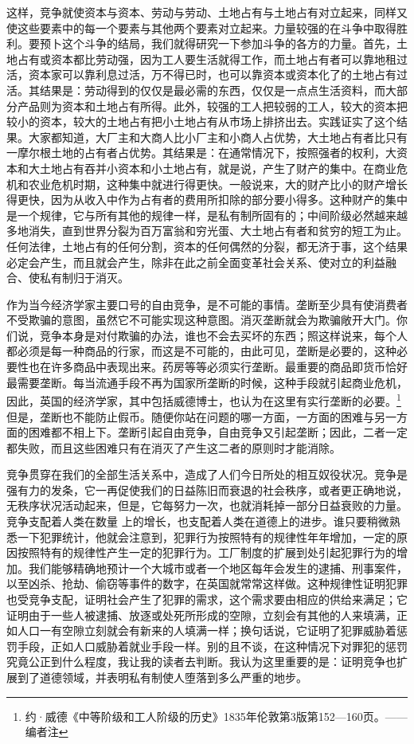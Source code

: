 \documentclass[a4paper,twoside,12pt,AutoFakeBold]{ctexart}
\begin{document}
这样，竞争就使资本与资本、劳动与劳动、土地占有与土地占有对立起来，同样又使这些要素中的每一个要素与其他两个要素对立起来。力量较强的在斗争中取得胜利。要预卜这个斗争的结局，我们就得研究一下参加斗争的各方的力量。首先，土地占有或资本都比劳动强，因为工人要生活就得工作，而土地占有者可以靠地租过活，资本家可以靠利息过活，万不得已时，也可以靠资本或资本化了的土地占有过活。其结果是：劳动得到的仅仅是最必需的东西，仅仅是一点点生活资料，而大部分产品则为资本和土地占有所得。此外，较强的工人把较弱的工人，较大的资本把较小的资本，较大的土地占有把小土地占有从市场上排挤出去。实践证实了这个结果。大家都知道，大厂主和大商人比小厂主和小商人占优势，大土地占有者比只有一摩尔根土地的占有者占优势。其结果是：在通常情况下，按照强者的权利，大资本和大土地占有吞并小资本和小土地占有，就是说，产生了财产的集中。在商业危机和农业危机时期，这种集中就进行得更快。一般说来，大的财产比小的财产增长得更快，因为从收入中作为占有者的费用所扣除的部分要小得多。这种财产的集中是一个规律，它与所有其他的规律一样，是私有制所固有的；中间阶级必然越来越多地消失，直到世界分裂为百万富翁和穷光蛋、大土地占有者和贫穷的短工为止。任何法律，土地占有的任何分割，资本的任何偶然的分裂，都无济于事，这个结果必定会产生，而且就会产生，除非在此之前全面变革社会关系、使对立的利益融合、使私有制归于消灭。

作为当今经济学家主要口号的自由竞争，是不可能的事情。垄断至少具有使消费者不受欺骗的意图，虽然它不可能实现这种意图。消灭垄断就会为欺骗敞开大门。你们说，竞争本身是对付欺骗的办法，谁也不会去买坏的东西；照这样说来，每个人都必须是每一种商品的行家，而这是不可能的，由此可见，垄断是必要的，这种必要性也在许多商品中表现出来。药房等等必须实行垄断。最重要的商品即货币恰好最需要垄断。每当流通手段不再为国家所垄断的时候，这种手段就引起商业危机，因此，英国的经济学家，其中包括威德博士，也认为在这里有实行垄断的必要。\footnote{约·威德《中等阶级和工人阶级的历史》1835年伦敦第3版第152—160页。——编者注 }但是，垄断也不能防止假币。随便你站在问题的哪一方面，一方面的困难与另一方面的困难都不相上下。垄断引起自由竞争，自由竞争又引起垄断；因此，二者一定都失败，而且这些困难只有在消灭了产生这二者的原则时才能消除。

竞争贯穿在我们的全部生活关系中，造成了人们今日所处的相互奴役状况。竞争是强有力的发条，它一再促使我们的日益陈旧而衰退的社会秩序，或者更正确地说，无秩序状况活动起来，但是，它每努力一次，也就消耗掉一部分日益衰败的力量。竞争支配着人类在数量 上的增长，也支配着人类在道德上的进步。谁只要稍微熟悉一下犯罪统计，他就会注意到，犯罪行为按照特有的规律性年年增加，一定的原因按照特有的规律性产生一定的犯罪行为。工厂制度的扩展到处引起犯罪行为的增加。我们能够精确地预计一个大城市或者一个地区每年会发生的逮捕、刑事案件，以至凶杀、抢劫、偷窃等事件的数字，在英国就常常这样做。这种规律性证明犯罪也受竞争支配，证明社会产生了犯罪的需求，这个需求要由相应的供给来满足；它证明由于一些人被逮捕、放逐或处死所形成的空隙，立刻会有其他的人来填满，正如人口一有空隙立刻就会有新来的人填满一样；换句话说，它证明了犯罪威胁着惩罚手段，正如人口威胁着就业手段一样。别的且不谈，在这种情况下对罪犯的惩罚究竟公正到什么程度，我让我的读者去判断。我认为这里重要的是：证明竞争也扩展到了道德领域，并表明私有制使人堕落到多么严重的地步。
\end{document}
